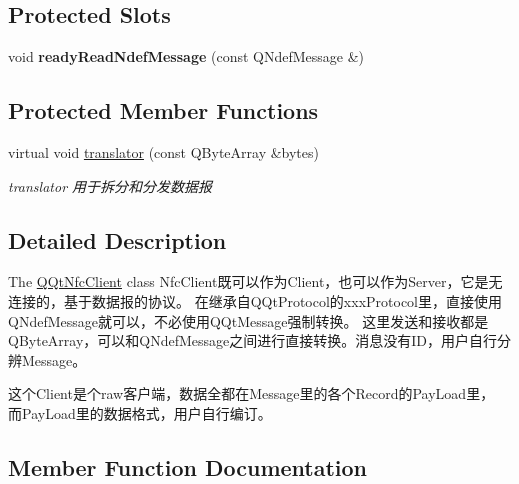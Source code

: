 \subsection*{Protected Slots}
\begin{DoxyCompactItemize}
\item 
\mbox{\label{class_q_qt_nfc_client_ab4ca864da3b110d3bae616d31abca2cb}} 
void {\bfseries ready\+Read\+Ndef\+Message} (const Q\+Ndef\+Message \&)
\end{DoxyCompactItemize}
\subsection*{Protected Member Functions}
\begin{DoxyCompactItemize}
\item 
virtual void \mbox{\hyperlink{class_q_qt_nfc_client_a5b8bb64f83317f7d12370c473a66e4f0}{translator}} (const Q\+Byte\+Array \&bytes)
\begin{DoxyCompactList}\small\item\em translator 用于拆分和分发数据报 \end{DoxyCompactList}\end{DoxyCompactItemize}


\subsection{Detailed Description}
The \mbox{\hyperlink{class_q_qt_nfc_client}{Q\+Qt\+Nfc\+Client}} class Nfc\+Client既可以作为\+Client，也可以作为\+Server，它是无连接的，基于数据报的协议。 在继承自\+Q\+Qt\+Protocol的xxx\+Protocol里，直接使用\+Q\+Ndef\+Message就可以，不必使用\+Q\+Qt\+Message强制转换。 这里发送和接收都是\+Q\+Byte\+Array，可以和\+Q\+Ndef\+Message之间进行直接转换。消息没有\+I\+D，用户自行分辨\+Message。 

这个\+Client是个raw客户端，数据全都在\+Message里的各个\+Record的\+Pay\+Load里， 而\+Pay\+Load里的数据格式，用户自行编订。 

\subsection{Member Function Documentation}
\mbox{\label{class_q_qt_nfc_client_aa6ac0c535ce6014b43e3291c4316e605}} 
